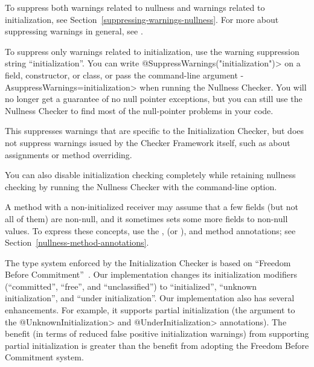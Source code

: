 
To suppress both warnings related to nullness and warnings related to initialization,
see Section~\ref{suppressing-warnings-nullness}.
For more about suppressing warnings in general, see
.

To suppress only warnings related to initialization, use the
warning suppression string ``initialization''.
You can write \<@SuppressWarnings("initialization")>
on a field, constructor, or
class, or pass the command-line argument
\<-AsuppressWarnings=initialization> when
running the Nullness Checker.
You will no longer get a guarantee
of no null pointer exceptions, but you can still use the Nullness Checker
to find most of the null-pointer problems in your code.

This suppresses warnings that are specific to the Initialization Checker,
but does not suppress warnings issued by the Checker Framework itself, such
as about assignments or method overriding.

You can also disable initialization checking completely while retaining
nullness checking by running the Nullness Checker with the
 command-line option.




A method with a non-initialized receiver may assume that a few fields (but not all
of them) are non-null, and it sometimes sets some more fields to non-null
values.  To express these concepts, use the
,
(or ), and
 method annotations;
see Section~\ref{nullness-method-annotations}.



The type system enforced by the Initialization Checker is based on
``Freedom Before Commitment''~\cite{SummersM2011}.  Our implementation
changes its initialization modifiers (``committed'', ``free'', and
``unclassified'') to ``initialized'', ``unknown initialization'', and
``under initialization''.  Our implementation also has several
enhancements.  For example, it supports partial initialization (the
argument to the \<@UnknownInitialization> and \<@UnderInitialization>
annotations).  The benefit (in terms of reduced false positive
initialization warnings) from supporting partial initialization is
greater than the benefit from adopting the Freedom Before Commitment system.



